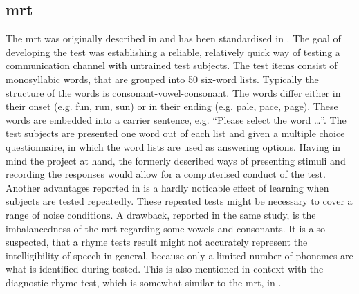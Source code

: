 \subsection{\gls{mrt}}\label{ssec:mrt}
The \gls{mrt} was originally described in \citep{mrt_63} and has been standardised in \citep{ansi_s2.3}. The goal of developing the test was establishing a reliable, relatively quick way of testing a communication channel with untrained test subjects.
The test items consist of monosyllabic words, that are grouped into 50 six-word lists. Typically the structure of the words is consonant-vowel-consonant. The words differ either in their onset (e.g. fun, run, sun) or in their ending (e.g. pale, pace, page). 
These words are embedded into a carrier sentence, e.g. \enquote{Please select the word \dots}. 
The test subjects are presented one word out of each list and given a multiple choice questionnaire, in which the word lists are used as answering options. 
Having in mind the project at hand, the formerly described ways of presenting stimuli and recording the responses would allow for a computerised conduct of the test.
Another advantages reported in \citep[p. 17]{arl_us_army} is a hardly noticable effect of learning when subjects are tested repeatedly. These repeated tests might be necessary to cover a range of noise conditions.
A drawback, reported in the same study, is the imbalancedness of the \gls{mrt} regarding some vowels and consonants. 
It is also suspected, that a rhyme tests result might not accurately represent the intelligibility of speech in general, because only a limited number of phonemes are what is identified during tested. This is also mentioned in context with the diagnostic rhyme test, which is somewhat similar to the \gls{mrt}, in \citep{greenspan_98}. 

